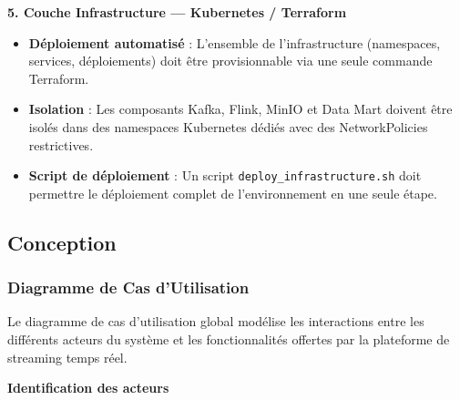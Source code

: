 \vspace{0.3cm}
\textbf{5. Couche Infrastructure --- Kubernetes / Terraform}

\begin{itemize}[leftmargin=1.5cm]
    \item \textbf{Déploiement automatisé} : L'ensemble de l'infrastructure (namespaces, services, déploiements) doit être provisionnable via une seule commande Terraform.
    \item \textbf{Isolation} : Les composants Kafka, Flink, MinIO et Data Mart doivent être isolés dans des namespaces Kubernetes dédiés avec des NetworkPolicies restrictives.
    \item \textbf{Script de déploiement} : Un script \texttt{deploy\_infrastructure.sh} doit permettre le déploiement complet de l'environnement en une seule étape.
\end{itemize}

\newpage

\subsection{Conception}
\vspace{0.5cm}

\subsubsection{Diagramme de Cas d'Utilisation}
\vspace{0.3cm}

Le diagramme de cas d'utilisation global modélise les interactions entre les différents acteurs du système et les fonctionnalités offertes par la plateforme de streaming temps réel.

\vspace{0.3cm}
\textbf{Identification des acteurs}

